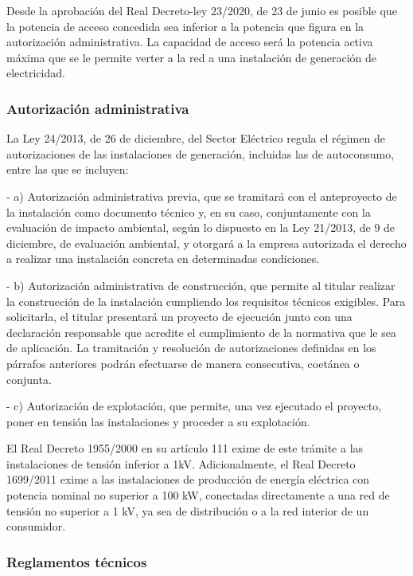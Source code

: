\documentclass{article}
\begin{document}
Desde la aprobación del Real Decreto-ley 23/2020, de 23 de junio es posible que la potencia de acceso concedida sea inferior a la potencia que figura en la autorización administrativa. La capacidad de acceso será la potencia activa máxima que se le permite verter a la red a una instalación de generación de electricidad.

\subsubsection{Autorización administrativa}

La Ley 24/2013, de 26 de diciembre, del Sector Eléctrico regula el régimen de autorizaciones de las instalaciones de generación, incluidas las de autoconsumo, entre las que se incluyen:

- a) Autorización administrativa previa, que se tramitará con el anteproyecto de la instalación como documento técnico y, en su caso, conjuntamente con la evaluación de impacto ambiental, según lo dispuesto en la Ley 21/2013, de 9 de diciembre, de evaluación ambiental, y otorgará a la empresa autorizada el derecho a realizar una instalación concreta en determinadas condiciones.

- b) Autorización administrativa de construcción, que permite al titular realizar la construcción de la instalación cumpliendo los requisitos técnicos exigibles. Para solicitarla, el titular presentará un proyecto de ejecución junto con una declaración responsable que acredite el cumplimiento de la normativa que le sea de aplicación. La tramitación y resolución de autorizaciones definidas en los párrafos anteriores podrán efectuarse de manera consecutiva, coetánea o conjunta.

- c) Autorización de explotación, que permite, una vez ejecutado el proyecto, poner en tensión las instalaciones y proceder a su explotación.

El Real Decreto 1955/2000 en su artículo 111 exime de este trámite a las instalaciones de tensión inferior a 1kV. Adicionalmente, el Real Decreto 1699/2011 exime a las instalaciones de producción de energía eléctrica con potencia nominal no superior a 100 kW, conectadas directamente a una red de tensión no superior a 1 kV, ya sea de distribución o a la red interior de un consumidor.

\subsubsection{Reglamentos técnicos}
\end{document}
